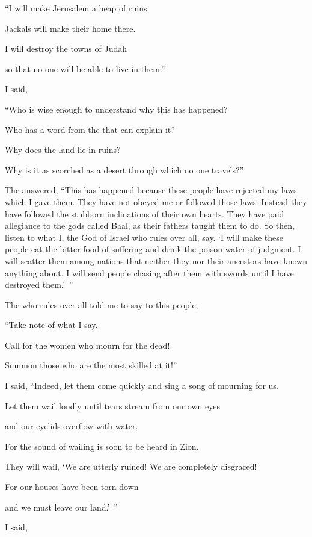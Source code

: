 {\par }{\Q “I will make
Jerusalem
a heap
of ruins.
\par }{\Q Jackals
will make their home
there.

\par }{\Q I will destroy
the towns
of Judah
\par }{\Q so that no one
will be able to live in them.”
\par }{\PP {}I said,

\par }{\Q “Who
is wise
enough to understand
why this
has happened?

\par }{\Q Who
has a word
from the
{}
that can explain
it?

\par }{\Q Why
does the land
lie in ruins?
\par }{\Q Why
is it as scorched
as a desert
through which no
one travels?”
\par }{\PP {}The
{}
answered,
“This
has happened
because these people have rejected
my laws
which
I gave
them. They have not
obeyed
me
or
followed those laws.
Instead they have followed
the stubborn inclinations
of their own hearts.
They have paid allegiance
to the gods called Baal,
as their fathers
taught them to do.
So
then, listen to what
I, the
{}
God
of Israel
who rules over all,
say. ‘I
will make these
people
eat
the
bitter food of suffering
and drink
the poison
water of judgment.
I will scatter
them among nations
that
neither
they
nor their ancestors
have known
anything
about. I will send
people chasing after
them with swords
until
I have destroyed them.’ ”
\par }{\PP {}The
{}
who rules over all
told me to say
to this people,

\par }{\Q “Take note
of what I say.

\par }{\Q Call
for the women who mourn
for the dead!
\par }{\Q Summon those who are the most skilled at it!”
\par }{\Q {}I said, “Indeed, let them come quickly
and sing
a song of mourning for us.
\par }{\Q Let them wail
loudly
until tears
stream from our own eyes
\par }{\Q and our eyelids
overflow
with water.
\par }{\Q {}For
the sound
of wailing
is soon to be heard
in Zion.
\par }{\Q They will wail, ‘We are utterly ruined! We are completely
disgraced!
\par }{\Q For
our houses
have been torn down
\par }{\Q and we must leave
our land.’ ”
\par }{\PP {}I said,

}
